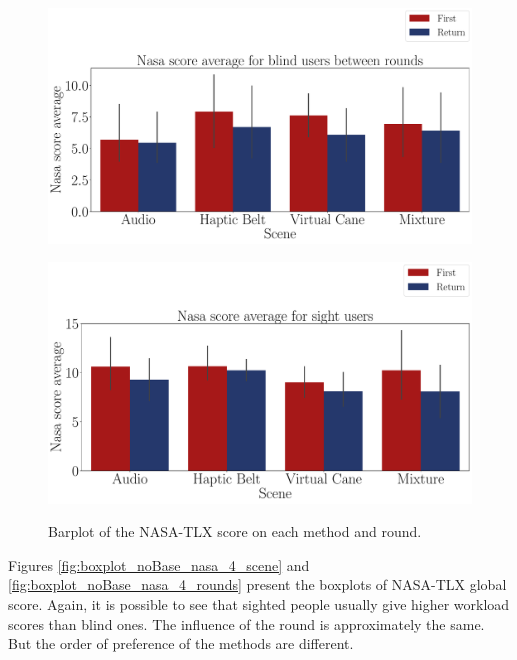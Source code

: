 \begin{figure}[!htb]
    \centering
    \begin{minipage}{\textwidth}
        \centering
        \includegraphics[width = 0.8\linewidth]{Resultados/Nasa/Figuras/pdf/barplot_nasa_avg_4_scene_blind.pdf}
        \label{fig:barplot_nasa_avg_4_scene_blind}
    \end{minipage}
    \begin{minipage}{\textwidth}
        \centering
        \includegraphics[width = 0.8\linewidth]{Resultados/Nasa/Figuras/pdf/barplot_nasa_avg_4_scene_sight.pdf}
        \label{fig:barplot_nasa_avg_4_scene_sight}
    \end{minipage}
    \caption{Barplot of the NASA-TLX score on each method and round.}
    \label{fig:barplot_nasa_avg_4_scene}
\end{figure}

Figures \ref{fig:boxplot_noBase_nasa_4_scene} and \ref{fig:boxplot_noBase_nasa_4_rounds} present the boxplots of NASA-TLX global score. Again, it is possible to see that sighted people usually give higher workload scores than blind ones. The influence of the round is approximately the same. But the order of preference of the methods are different.

